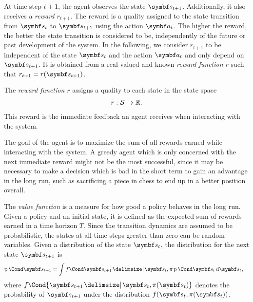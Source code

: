 At time step $t+1$, the agent observes the state $\mat{s}_{t+1}$.
Additionally, it also receives a \emph{reward $r_{t+1}$}.
The reward is a quality assigned to the state transition from $\mat{s}_t$ to $\mat{s}_{t+1}$ using the action $\mat{a}_t$.
The higher the reward, the better the state transition is considered to be, independently of the future or past development of the system.
In the following, we consider $r_{t+1}$ to be independent of the state $\mat{s}_t$ and the action $\mat{a}_t$ and only depend on $\mat{s}_{t+1}$.
It is obtained from a real-valued and known \emph{reward function $r$} such that $r_{t+1} = r(\mat{s}_{t+1})$.
\begin{definition}
    \label{def:reward_function}
    The \emph{reward function $r$} assigns a quality to each state in the state space
    \begin{align}
        r : \mathcal{S} \to \mathbb{R}.
    \end{align}
    This reward is the immediate feedback an agent receives when interacting with the system.
\end{definition}

The goal of the agent is to maximize the sum of all rewards earned while interacting with the system.
A greedy agent which is only concerned with the next immediate reward might not be the most successful, since it may be necessary to make a decision which is bad in the short term to gain an advantage in the long run, such as sacrificing a piece in chess to end up in a better position overall.

The \emph{value function} is a measure for how good a policy behaves in the long run.
Given a policy and an initial state, it is defined as the expected sum of rewards earned in a time horizon $T$.
Since the transition dynamics are assumed to be probabilistic, the states at all time steps greater than zero can be random variables.
Given a distribution of the state $\mat{s_t}$, the distribution for the next state $\mat{s_{t+1}}$ is
\begin{align}
    \Prob{\mat{s_{t+1}}} &= \int \Fun{f}{\mat{s_{t+1}} \given \mat{s_t}, \pi}\Prob{\mat{s_t}} \diff \mat{s_t},
\end{align}
where $f\Cond{\mat{s_{t+1}} \given \mat{s_t}, \pi(\mat{s_t})}$ denotes the probability of $\mat{s_{t+1}}$ under the distribution $f(\mat{s_t}, \pi(\mat{s_t}))$.

